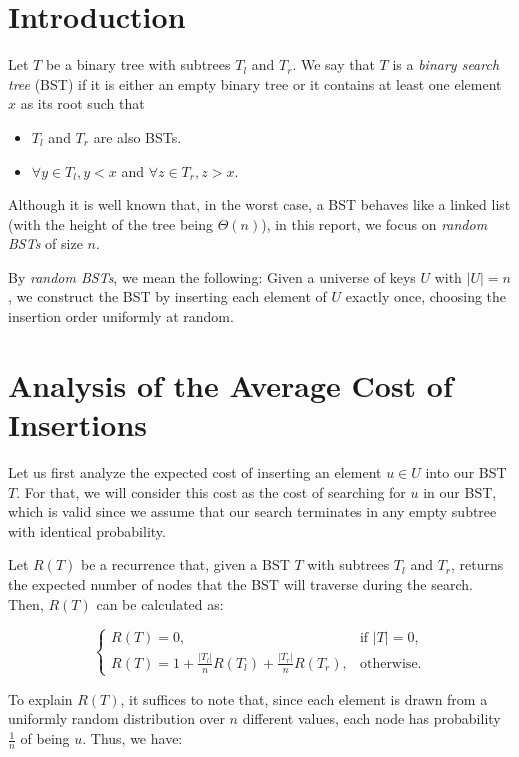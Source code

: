 \section{Introduction}  
Let $T$ be a binary tree with subtrees $T_l$ and $T_r$. We say that $T$ is a \textit{binary search tree} (BST) if it is either an empty binary tree or it contains at least one element $x$ as its root such that  

\begin{itemize}  
    \item $T_l$ and $T_r$ are also BSTs.  
    \item $\forall y \in T_l, y < x$ and $\forall z \in T_r, z > x$.  
\end{itemize}  

Although it is well known that, in the worst case, a BST behaves like a linked list (with the height of the tree being $\Theta(n)$), in this report, we focus on \textit{random BSTs} of size $n$.  

By \textit{random BSTs}, we mean the following: Given a universe of keys $U$ with $|U| = n$, we construct the BST by inserting each element of $U$ exactly once, choosing the insertion order uniformly at random.

\section{Analysis of the Average Cost of Insertions}
Let us first analyze the expected cost of inserting an element \( u \in U \) into our BST \( T \). For that, we will consider this cost as the cost of searching for \( u \) in our BST, which is valid since we assume that our search terminates in any empty subtree with identical probability. 

Let \( R(T) \) be a recurrence that, given a BST \( T \) with subtrees \( T_l \) and \( T_r \), returns the expected number of nodes that the BST will traverse during the search. Then, \( R(T) \) can be calculated as:

\[
\begin{cases}
    R(T) = 0, & \text{if } |T| = 0, \\
    R(T) = 1 + \frac{|T_l|}{n} R(T_l) + \frac{|T_r|}{n} R(T_r), & \text{otherwise}.
\end{cases}
\]

To explain \( R(T) \), it suffices to note that, since each element is drawn from a uniformly random distribution over \( n \) different values, each node has probability \( \frac{1}{n} \) of being $u$. Thus, we have:

